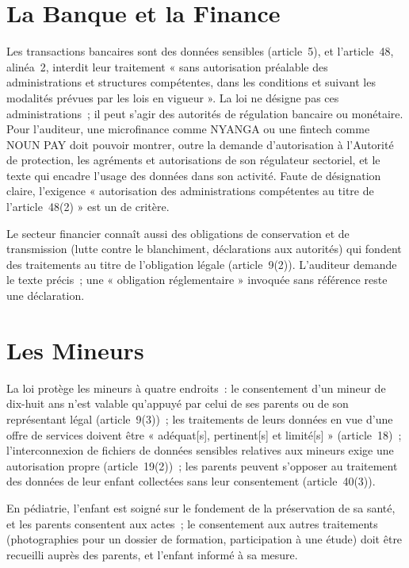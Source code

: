 \section{La Banque et la Finance}
\label{sec:c15-banque}

Les transactions bancaires sont des données sensibles (article~5), et
l'article~48, alinéa~2, interdit leur traitement « sans autorisation
préalable des administrations et structures compétentes, dans les
conditions et suivant les modalités prévues par les lois en vigueur ». La
loi ne désigne pas ces administrations~; il peut s'agir des autorités de
régulation bancaire ou monétaire. Pour l'auditeur, une microfinance comme
NYANGA ou une fintech comme NOUN PAY doit pouvoir montrer, outre la demande
d'autorisation à l'Autorité de protection, les agréments et autorisations
de son régulateur sectoriel, et le texte qui encadre l'usage des données
dans son activité. Faute de désignation claire, l'exigence « autorisation
des administrations compétentes au titre de l'article~48(2) » est un
\NEK{} de critère.

Le secteur financier connaît aussi des obligations de conservation et de
transmission (lutte contre le blanchiment, déclarations aux autorités) qui
fondent des traitements au titre de l'obligation légale (article~9(2)).
L'auditeur demande le texte précis~; une « obligation réglementaire »
invoquée sans référence reste une déclaration.

\section{Les Mineurs}
\label{sec:c15-mineurs}

La loi protège les mineurs à quatre endroits~: le consentement d'un mineur
de dix-huit ans n'est valable qu'appuyé par celui de ses parents ou de son
représentant légal (article~9(3))~; les traitements de leurs données en vue
d'une offre de services doivent être « adéquat[s], pertinent[s] et
limité[s] » (article~18)~; l'interconnexion de fichiers de données
sensibles relatives aux mineurs exige une autorisation propre
(article~19(2))~; les parents peuvent s'opposer au traitement des données
de leur enfant collectées sans leur consentement (article~40(3)).

En pédiatrie, l'enfant est soigné sur le fondement de la préservation de sa
santé, et les parents consentent aux actes~; le consentement aux autres
traitements (photographies pour un dossier de formation, participation à
une étude) doit être recueilli auprès des parents, et l'enfant informé à sa
mesure.

